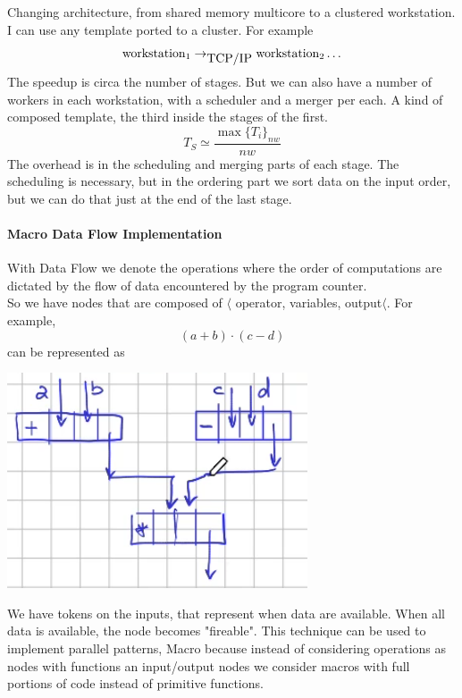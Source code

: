 \documentclass[10pt]{report}
\begin{document}
Changing architecture, from shared memory multicore to a clustered workstation. I can use any template ported to a cluster. For example
$$\hbox{workstation}_1\rightarrow_{\hbox{TCP/IP}}\hbox{workstation}_2\ldots$$
The speedup is circa the number of stages. But we can also have a number of workers in each workstation, with a scheduler and a merger per each. A kind of composed template, the third inside the stages of the first.
$$T_S\simeq\frac{\max\{T_i\}_{nw}}{nw}$$
The overhead is in the scheduling and merging parts of each stage. The scheduling is necessary, but in the ordering part we sort data on the input order, but we can do that just at the end of the last stage.
\paragraph{Macro Data Flow Implementation} With Data Flow we denote the operations where the order of computations are dictated by the flow of data encountered by the program counter.\\
So we have nodes that are composed of $\langle$ operator, variables, output$\langle$. For example, $$(a+b)\cdot(c-d)$$ can be represented as 
\begin{center}
	\includegraphics[scale=0.5]{7.png}
\end{center}
We have tokens on the inputs, that represent when data are available. When all data is available, the node becomes "fireable". This technique can be used to implement parallel patterns, Macro because instead of considering operations as nodes with functions an input/output nodes we consider macros with full portions of code instead of primitive functions.\\
\end{document}
